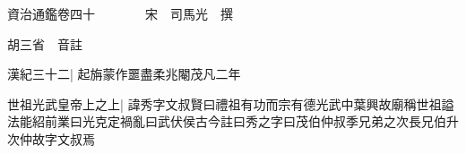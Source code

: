 






























































資治通鑑卷四十　　　　宋　司馬光　撰

胡三省　音註

漢紀三十二|{
	起旃蒙作噩盡柔兆閹茂凡二年}


世祖光武皇帝上之上|{
	諱秀字文叔賢曰禮祖有功而宗有德光武中葉興故廟稱世祖謚法能紹前業曰光克定禍亂曰武伏侯古今註曰秀之字曰茂伯仲叔季兄弟之次長兄伯升次仲故字文叔焉}



